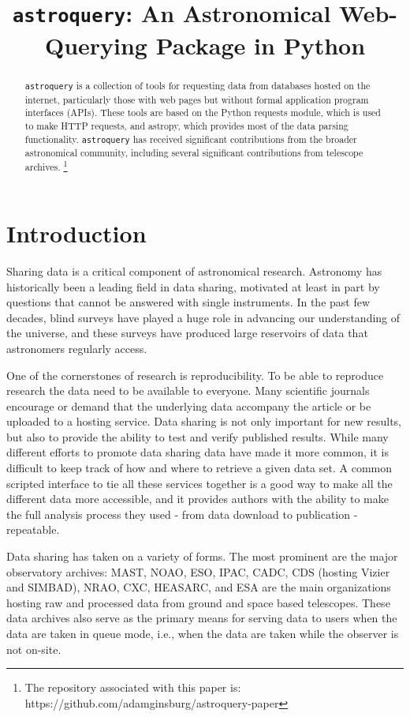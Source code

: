 \documentclass[twocolumn]{aastex61}
\newcommand{\package}[1]{\texttt{#1}\xspace}
\newcommand{\astroquery}{\package{astroquery}}
\begin{document}


\title{\astroquery: An Astronomical Web-Querying Package in Python}

\begin{abstract}
\astroquery is a collection of tools for requesting data from databases hosted
on the internet, particularly those with web pages but without formal
application program interfaces (APIs).  These tools are based on the Python
requests module, which is used to make HTTP requests, and astropy, which
provides most of the data parsing functionality. \astroquery has received
significant contributions from the broader astronomical community, including
several significant contributions from telescope archives.
\footnote{
The repository associated with this paper is:
https://github.com/adamginsburg/astroquery-paper
}
\end{abstract}


\section{Introduction}
Sharing data is a critical component of astronomical research.  Astronomy
has historically been a leading field in data sharing, motivated at least
in part by questions that cannot be answered with single instruments.
In the past few decades, blind surveys have played a huge role in advancing our
understanding of the universe, and these surveys have produced large reservoirs
of data that astronomers regularly access.

One of the cornerstones of research is reproducibility. To be able to reproduce
research the  data need to be available to everyone. Many scientific journals
encourage or demand that the underlying data  accompany the article or be
uploaded to a hosting service. Data sharing is not only important for new
results, but also to provide the ability to test and verify published results.
While many different efforts to promote data sharing data have made it more
common, it is difficult to keep track of how and where to retrieve a given data
set. A common scripted interface to tie all these services together is a good
way to make all the different data more accessible, and it provides authors
with the ability to make the full analysis process they used - from data
download to publication - repeatable.

Data sharing has taken on a variety of forms.  The most prominent are the major
observatory archives: MAST, NOAO, ESO, IPAC, CADC, CDS (hosting Vizier and
SIMBAD), NRAO, CXC, HEASARC, and ESA are the main
organizations hosting raw and processed data from ground and space based
telescopes.  These data archives also serve as the primary means for serving data
to users when the data are taken in queue mode, i.e., when the data are taken
while the observer is not on-site.
\end{document}
